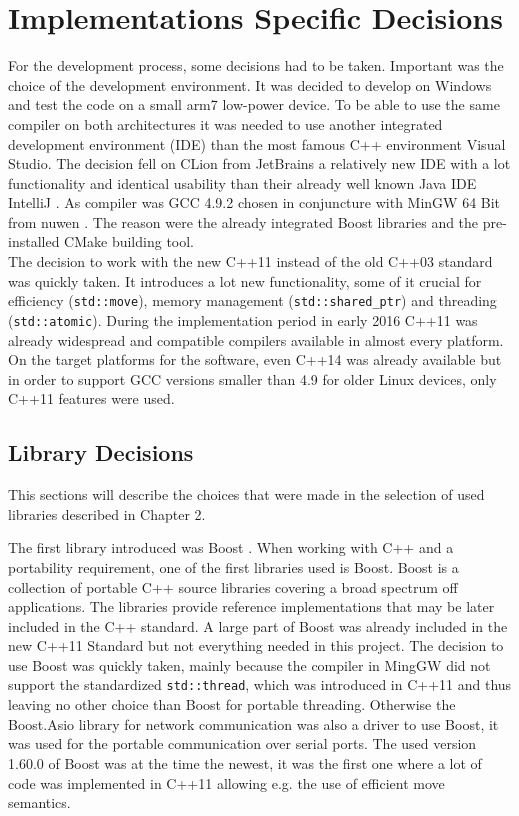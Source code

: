 \section{Implementations Specific Decisions}
For the development process, some decisions had to be taken. Important was the choice of the development environment. It was decided to develop on Windows and test the code on a small arm7 low-power device. To be able to use the same compiler on both architectures it was needed to use another integrated development environment (IDE) than the most famous C++ environment Visual Studio. The decision fell on CLion from JetBrains \cite{clion} a relatively new IDE with a lot functionality and identical usability than their already well known Java IDE IntelliJ \cite{intellij}. As compiler was GCC 4.9.2 chosen in conjuncture with MinGW 64 Bit from nuwen \cite{mingw}. The reason were the already integrated Boost libraries and the pre-installed CMake building tool.\\
The decision to work with the new C++11 \cite{cpp_11} instead of the old C++03 \cite{cpp_03} standard was quickly taken. It introduces a lot new functionality, some of it crucial for efficiency (\texttt{std::move}), memory management (\texttt{std::shared\_ptr}) and threading (\texttt{std::atomic}). During the implementation period in early 2016 C++11 was already widespread and compatible compilers available in almost every platform. On the target platforms for the software, even C++14 \cite{cpp_14} was already available but in order to support GCC versions smaller than 4.9 for older Linux devices, only C++11 features were used.
\subsection{Library Decisions}
This sections will describe the choices that were made in the selection of used libraries described in Chapter 2.

The first library introduced was Boost \cite{boost}. When working with C++ and a portability requirement, one of the first libraries used is Boost. Boost is a collection of portable C++ source libraries covering a broad spectrum off applications. The libraries provide reference implementations that may be later included in the C++ standard. A large part of Boost was already included in the new C++11 Standard \cite{cpp_11} but not everything needed in this project. The decision to use Boost was quickly taken, mainly because the compiler in MingGW \cite{mingw} did not support the standardized \texttt{std::thread}, which was introduced in C++11 and thus leaving no other choice than Boost for portable threading. Otherwise the Boost.Asio library \cite{boost_asio} for network communication was also a driver to use Boost, it was used for the portable communication over serial ports. The used version 1.60.0 of Boost was at the time the newest, it was the first one where a lot of code was implemented in C++11 allowing e.g. the use of efficient move semantics.

